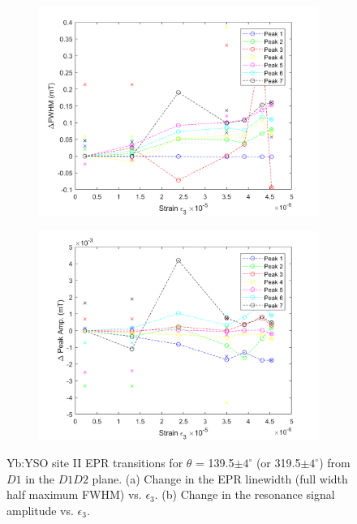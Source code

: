 \begin{figure}[H]
    \centering
    \begin{subfigure}[b]{0.45\textwidth}
        \centering
        \includegraphics[width=\textwidth]{strainexpthird2}
        \caption{\label{fig:strainexpthird2}}
    \end{subfigure}
    \begin{subfigure}[b]{0.45\textwidth}
        \centering
        \includegraphics[width=\textwidth]{strainexpthird3}
   \caption{\label{fig:strainexpthird3}}
   \end{subfigure}
   \caption{Yb:YSO site II EPR transitions for $\theta$ = 139.5$\pm 4^{\circ}$ (or 319.5$\pm 4^{\circ}$) from $D1$ in the $D1D2$ plane. (a) Change in the EPR linewidth (full width half maximum FWHM) vs. $\epsilon_{3}$. (b) Change in the resonance signal amplitude vs. $\epsilon_{3}$.}
\end{figure}
